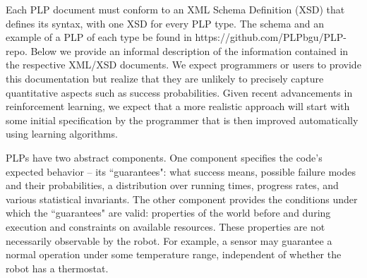 \documentclass[letterpaper]{article}
\newcommand\mNote[1]{\todo[inline, author=Michael, color=cyan]{#1}}
\newcommand\rNote[1]{\todo[inline, author=Ronen, color=yellow]{#1}}
\begin{document}
Each PLP document must conform to an XML Schema Definition (XSD) that defines its syntax,
with
one XSD for every PLP type.
The  schema and an example of a PLP of each type be found in https://github.com/PLPbgu/PLP-repo. Below we provide an informal description of the information contained in the respective XML/XSD documents. We expect programmers or users to provide this documentation
but realize that they are unlikely to
precisely capture
quantitative aspects such as success probabilities. Given recent advancements in reinforcement learning, we expect that a more realistic approach will start with some initial specification by the programmer that is then improved automatically using learning algorithms.






PLPs have two abstract components. One component specifies the code's expected behavior -- its ``guarantees": what success means,  possible failure modes and their probabilities, a distribution over running times, progress rates, and
various statistical invariants. The other component provides the conditions under which the ``guarantees" are valid:
properties of the world before and during execution and constraints on available resources. These properties are not necessarily observable by the robot. For example, a sensor may guarantee a normal operation under some temperature range, independent of whether the robot has a thermostat.




\end{document}
